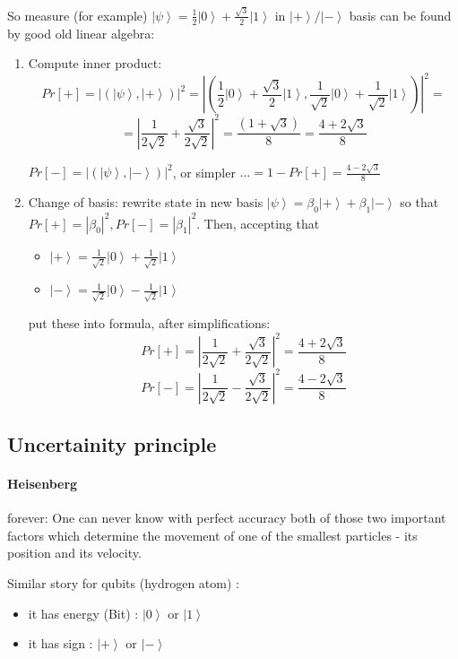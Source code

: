 \documentclass{scrartcl}
\newcommand{\ket}[1]{\left| #1 \right>} %
\begin{document}
So measure (for example) $\ket\psi = \frac1{2} \ket0 + \frac{\sqrt{3}}{2}\ket1$
in $\ket+ / \ket-$ basis can be found by good old linear algebra:
\begin{enumerate}
\item Compute inner product:
  \[ Pr[+] = |(\ket\psi, \ket+)|^2 = \left|\left(\frac1{2}\ket0 +
      \frac{\sqrt{3}}{2}\ket1, \frac1{\sqrt{2}}\ket0 + \frac1{\sqrt{2}}\ket1
    \right)\right|^2 =\]
  \[ = \left| \frac1{2 \sqrt{2}} + \frac{\sqrt{3}}{2\sqrt{2}} \right|^2 =
  \frac{(1 + \sqrt{3})} {8} = \frac{4 + 2 \sqrt{3}}8 \]

  $ Pr[-] = |(\ket\psi, \ket-)|^2$, or simpler $\dots = 1 - Pr[+] = \frac{4 - 2
    \sqrt{3}}{8}$
\item Change of basis: rewrite state in new basis $\ket\psi = \beta_0 \ket+ +
  \beta_1 \ket-$ so that $Pr[+] = |\beta_0|^2, Pr[-] = |\beta_1|^2$. Then,
  accepting that
  \begin{itemize}
  \item $\ket+ = \frac1{\sqrt{2}} \ket0 + \frac1{\sqrt{2}} \ket1$
  \item $\ket- = \frac1{\sqrt{2}} \ket0 - \frac1{\sqrt{2}} \ket1$
  \end{itemize}
  put these into formula, after simplifications:
  \[ Pr[+] = | \frac1{2 \sqrt{2}} + \frac{\sqrt{3}}{2\sqrt{2}} |^2 = \frac{4 + 2
    \sqrt{3}}{8} \]
  \[ Pr[-] = | \frac1{2 \sqrt{2}} - \frac{\sqrt{3}}{2\sqrt{2}} |^2 = \frac{4 - 2
    \sqrt{3}}{8} \]
\end{enumerate}

\subsection{Uncertainity principle}
\label{sec:2-4}

\paragraph{Heisenberg}forever: One can never know with perfect accuracy both of
those two important factors which determine the movement of one of the smallest
particles - its position and its velocity.

Similar story for qubits (hydrogen atom) :
\begin{itemize}
\item it has energy (Bit) : $\ket0$ or $\ket1$
\item it has sign : $\ket+$ or $\ket-$
\end{itemize}
\end{document}
